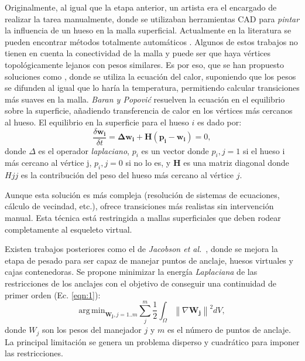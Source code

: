 Originalmente, al igual que la etapa anterior, un artista era el encargado de realizar la tarea manualmente, donde se utilizaban herramientas \ac{CAD} para \emph{pintar} la influencia de un hueso en la malla superficial. Actualmente en la literatura se pueden encontrar métodos totalmente automáticos \cite{huang2013robust,pan2017automatic}. 
Algunos de estos trabajos no tienen en cuenta la conectividad de la malla y puede ser que haya vértices topológicamente lejanos con pesos similares. Es por eso, que se han propuesto soluciones como \cite{Baran:2007}, donde se utiliza la ecuación del calor, suponiendo que los pesos se difunden al igual que lo haría la temperatura, permitiendo calcular transiciones más suaves en la malla. \emph{Baran y Popovi\'{c}} resuelven la ecuación en el equilibrio sobre la superficie, añadiendo transferencia de calor en los vértices más cercanos al hueso. El equilibrio en la superficie para el hueso $i$ es dado por:
\begin{equation}
\label{eqn:baran}
 \frac{\delta \mathbf{w_i}}{ \delta t} = \mathbf{ \Delta w_i} + \mathbf{H(p_i-w_i)} = 0,
\end{equation}
donde $\Delta$ es el operador \emph{laplaciano}, $p_i$ es un vector donde $p_i,j=1$ si el hueso i más cercano al vértice j, $p_i,j=0$ si no lo es, y $\mathbf{H}$ es una matriz diagonal donde $Hjj$ es la contribución del peso del hueso más cercano al vértice $j$.

Aunque esta solución es más compleja (resolución de sistemas de ecuaciones, cálculo de vecindad, etc.), ofrece transiciones más realistas sin intervención manual. %
Esta técnica está restringida a mallas superficiales que deben rodear completamente al esqueleto virtual.

Existen trabajos posteriores como el de \emph{Jacobson et al.}~\cite{Jacobson:2011}, donde se mejora la etapa de pesado para ser capaz de manejar puntos de anclaje, huesos virtuales y cajas contenedoras. Se propone minimizar la energía \emph{Laplaciana} de las restricciones de los anclajes con el objetivo de conseguir una continuidad  de primer orden (Ec. \ref{eqn:1}):
\begin{equation}
\label{eqn:1}
\mathrm{arg\,min}_{\mathbf{W_j}, j=1..m}\sum_{j}^m\frac{1}{2}\int_\Omega \left \|  \nabla \mathbf{W_j}\right \|^2 dV,
\end{equation}
donde $W_j$ son los pesos del manejador $j$ y $m$ es el número de puntos de anclaje. La principal limitación se genera un problema disperso y cuadrático para imponer las restricciones. %

